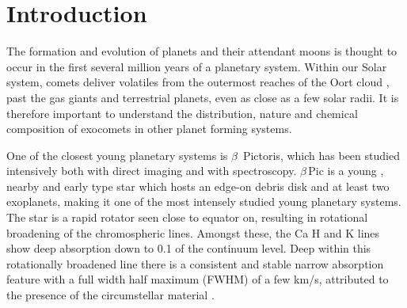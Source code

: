 \documentclass{aa}
\newcommand{\kms}{km s$^{-1}$}
\newcommand{\bp}{$\beta$\,Pic}
\begin{document}

   \maketitle
%

\section{Introduction}

The formation and evolution of planets and their attendant moons is thought to occur in the first several million years of a planetary system.
%
Within our Solar system, comets deliver volatiles from the outermost reaches of the Oort cloud \citep{Obrien2018}, past the gas giants and terrestrial planets, even as close as a few solar radii.
%
It is therefore important to understand the distribution, nature and chemical composition of exocomets in other planet forming systems.

One of the closest young planetary systems is $\beta$~Pictoris, which has been studied intensively both with direct imaging and with spectroscopy.
%
\bp{} is a young \citep[$\sim 25$ Myr; see ][ for discussions]{Lee24}, nearby \citep[$19.63\pm 0.06$ pc, ][]{Lindegren21} and early type star \citep[A6V; ][]{Gray06} which hosts an edge-on debris disk and at least two exoplanets, making it one of the most intensely studied young planetary systems.
%
The star is a rapid rotator \citep[$124\pm 3$\,\kms{}; ][]{Koen03} seen close to equator on, resulting in rotational broadening of the chromospheric lines.
%
Amongst these, the Ca H and K lines show deep absorption down to 0.1 of the continuum level.
%
Deep within this rotationally broadened line there is a consistent and stable narrow absorption feature with a full width half maximum (FWHM) of a few km/s, attributed to the presence of the circumstellar material \citep{Hobbs85,VidalMadjar86}.
\end{document}
